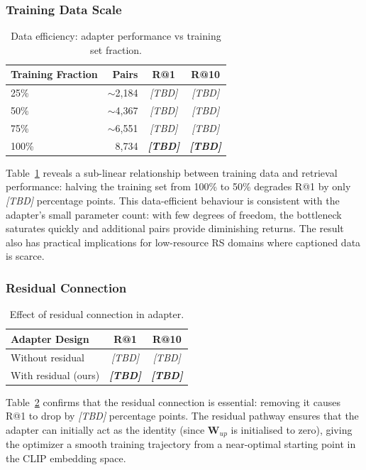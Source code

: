 \documentclass[review,12pt]{elsarticle}
\begin{document}
\subsubsection{Training Data Scale}
\begin{table}[h]
\centering
\caption{Data efficiency: adapter performance vs training set fraction.}
\label{tab:ablation_data}
\begin{tabular}{lrcc}
\toprule
\textbf{Training Fraction} & \textbf{Pairs} & R@1 & R@10 \\
\midrule
25\%  & $\sim$2,184 & \textit{[TBD]} & \textit{[TBD]} \\
50\%  & $\sim$4,367 & \textit{[TBD]} & \textit{[TBD]} \\
75\%  & $\sim$6,551 & \textit{[TBD]} & \textit{[TBD]} \\
100\% & 8,734       & \textbf{\textit{[TBD]}} & \textbf{\textit{[TBD]}} \\
\bottomrule
\end{tabular}
\end{table}

Table~\ref{tab:ablation_data} reveals a sub-linear relationship between
training data and retrieval performance: halving the training set from
100\% to 50\% degrades R@1 by only \textit{[TBD]} percentage points. This
data-efficient behaviour is consistent with the adapter's small
parameter count: with few degrees of freedom, the bottleneck saturates
quickly and additional pairs provide diminishing returns. The result
also has practical implications for low-resource RS domains where
captioned data is scarce.

\subsubsection{Residual Connection}
\begin{table}[h]
\centering
\caption{Effect of residual connection in adapter.}
\label{tab:ablation_residual}
\begin{tabular}{lcc}
\toprule
\textbf{Adapter Design} & R@1 & R@10 \\
\midrule
Without residual & \textit{[TBD]} & \textit{[TBD]} \\
With residual (ours) & \textbf{\textit{[TBD]}} & \textbf{\textit{[TBD]}} \\
\bottomrule
\end{tabular}
\end{table}

Table~\ref{tab:ablation_residual} confirms that the residual connection
is essential: removing it causes R@1 to drop by \textit{[TBD]} percentage
points. The residual pathway ensures that the adapter can initially act
as the identity (since $\mathbf{W}_{up}$ is initialised to zero), giving
the optimizer a smooth training trajectory from a near-optimal starting
point in the CLIP embedding space.
\end{document}

